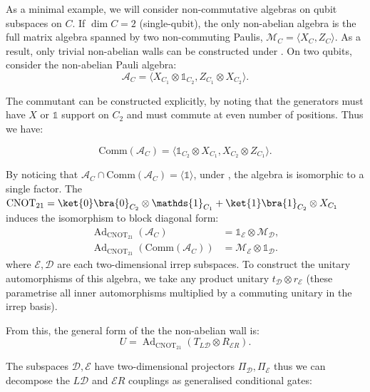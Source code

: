 \documentclass[11pt, twocolumn, floatfix, superscriptaddress, aps, prb, raggedbottom]{revtex4-2}
\newcommand{\comm}{\mathrm{Comm}}
\newcommand{\Id}{\mathds{1}}
\DeclareMathOperator{\Ad}{Ad}
\begin{document}
As a minimal example, we will consider non-commutative algebras on qubit subspaces on $C$. If $\dim C = 2$ (single-qubit), the only non-abelian algebra is the full matrix algebra spanned by two non-commuting Paulis, $\mathcal{M}_C = \langle X_C, Z_C \rangle$. As a result, only trivial non-abelian walls can be constructed under . On two qubits, consider the non-abelian Pauli algebra:
\begin{equation}
    \mathcal{A}_C = \langle X_{C_1} \otimes \Id_{C_2}, Z_{C_1} \otimes X_{C_2} \rangle.
\end{equation}

\noindent The commutant can be constructed explicitly, by noting that the generators must have $X$ or $\Id$ support on $C_2$ and must commute at even number of positions. Thus we have:

\begin{equation}
    \comm(\mathcal{A}_C) = \langle \Id_{C_2}\otimes X_{C_1}  ,X_{C_2}\otimes Z_{C_1} \rangle.
\end{equation}

By noticing that $\mathcal{A}_C \cap \comm(\mathcal{A}_C) = \langle \Id \rangle$, under , the algebra is isomorphic to a single factor. The $\mathrm{CNOT}_{21} = \ket{0}\bra{0}_{C_2} \otimes \Id_{C_1} + \ket{1}\bra{1}_{C_2} \otimes X_{C_1}$ induces the isomorphism to block diagonal form:
\begin{align}
    \Ad_{\mathrm{CNOT}_{21}}(\mathcal{A}_C) &= \Id_{\mathcal{E}} \otimes \mathcal{M}_{\mathcal{D}}, \\
    \Ad_{\mathrm{CNOT}_{21}}(\comm(\mathcal{A}_C)) &= \mathcal{M}_{\mathcal{E}} \otimes \Id_{\mathcal{D}}.
\end{align}
\noindent where $\mathcal{E}, \mathcal{D}$ are each two-dimensional irrep subspaces. To construct the unitary automorphisms of this algebra, we take any product unitary $t_{\mathcal{D}} \otimes r_{\mathcal{E}}$ (these parametrise all inner automorphisms multiplied by a commuting unitary in the irrep basis).

From this, the general form of the the non-abelian wall is: 
\begin{equation}
    U = \Ad_{\mathrm{CNOT}_{21}}( T_{L\mathcal{D}} \otimes R_{\mathcal{E}R}).
\end{equation}

The subspaces $\mathcal{D}, \mathcal{E}$ have two-dimensional projectors $\Pi_{\mathcal{D}},  \Pi_{\mathcal{E}}$ thus we can decompose the $L\mathcal{D}$ and $\mathcal{E}R$ couplings as generalised conditional gates:
\end{document}
